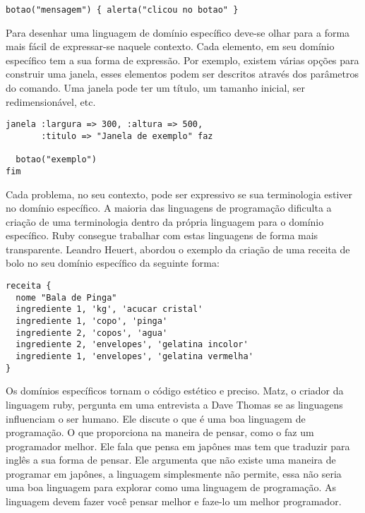 \documentclass[espaco=simples,appendix=Name]{abnt}
\begin{document}
\begin{lstlisting}[label=exemplo botao, caption=Simplicidade do botão]
botao("mensagem") { alerta("clicou no botao" } 
\end{lstlisting}


Para desenhar uma linguagem de domínio específico deve-se olhar para a forma mais fácil de expressar-se naquele contexto.
Cada elemento, em seu domínio específico tem a sua forma de expressão. Por exemplo,  existem várias opções para construir uma janela, esses elementos podem ser descritos através dos parâmetros do comando. Uma janela pode ter um título, um tamanho inicial, ser redimensionável, etc.

\begin{lstlisting}[label=exemplo janela, caption=Expressividade da construção de uma janela]
janela :largura => 300, :altura => 500, 
       :titulo => "Janela de exemplo" faz 

  botao("exemplo")
fim
\end{lstlisting}


Cada problema, no seu contexto, pode ser expressivo se sua terminologia estiver no domínio específico. A maioria das linguagens de programação dificulta a criação de uma terminologia dentro da própria linguagem para o domínio específico. Ruby consegue trabalhar com estas linguagens de forma mais transparente. Leandro Heuert\cite{dslLeandro}, abordou o exemplo da criação de uma receita de bolo no seu domínio específico da seguinte forma: 

\begin{lstlisting}[label=exemplo janela, caption=Expressividade de uma receita no seu domínio específico\cite{dslLeandro}]
receita {
  nome "Bala de Pinga"
  ingrediente 1, 'kg', 'acucar cristal'
  ingrediente 1, 'copo', 'pinga'
  ingrediente 2, 'copos', 'agua'
  ingrediente 2, 'envelopes', 'gelatina incolor'
  ingrediente 1, 'envelopes', 'gelatina vermelha'
}
\end{lstlisting}


Os domínios específicos tornam o código estético e preciso. Matz, o criador da linguagem ruby, pergunta em uma entrevista a Dave Thomas se as linguagens influenciam o ser humano. Ele discute o que é uma boa linguagem de programação. O que proporciona na maneira de pensar, como o faz um programador melhor. Ele fala que pensa em japônes mas tem que traduzir para inglês a sua forma de pensar. Ele argumenta que não existe uma maneira de programar em japônes, a linguagem simplesmente não permite, essa não seria uma boa linguagem para explorar como uma linguagem de programação. As linguagem devem fazer você pensar melhor e faze-lo um melhor programador.\cite{programmingRuby}
\end{document}
